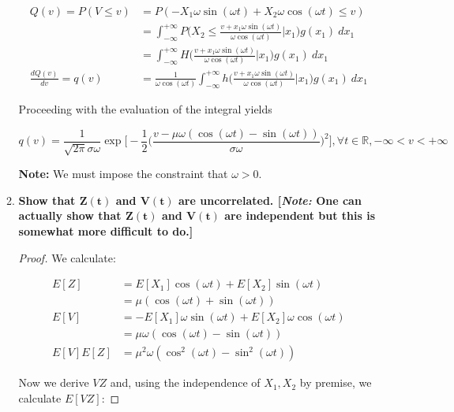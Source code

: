 \documentclass[10pt, oneside]{article}   	%
\theoremstyle{definition}
\begin{document}
\begin{enumerate}[label=9.\arabic*]
\begin{enumerate}
	\begin{align*}
	Q(v) = P(V \leq v) &= P(-X_1 \omega \sin(\omega t) + X_2 \omega \cos(\omega t) \leq v) \\
	&= \int^{+\infty}_{-\infty} P \bigg( X_2 \leq \frac{v + x_1 \omega \sin(\omega t)}{\omega \cos(\omega t)} \bigg| x_1 \bigg) g(x_1) \ dx_1 \\
	&= \int^{+\infty}_{-\infty} H \bigg( \frac{v + x_1 \omega \sin(\omega t)}{\omega \cos(\omega t)} \bigg| x_1 \bigg) g(x_1) \ dx_1 \\
	\frac{d Q(v)}{dv} = q(v) &= \frac{1}{\omega \cos(\omega t)} \int^{+\infty}_{-\infty} h \bigg( \frac{v + x_1 \omega \sin(\omega t)}{\omega \cos(\omega t)} \bigg| x_1 \bigg) g(x_1) \ dx_1
	\end{align*}
	
	Proceeding with the evaluation of the integral yields
	
	\[ \boxed{ q(v) = \frac{1}{\sqrt{2\pi} \sigma \omega} \exp \bigg[ -\frac{1}{2} \bigg( \frac{v - \mu \omega (\cos(\omega t) - \sin(\omega t))}{\sigma \omega} \bigg)^2 \bigg], \forall t \in \mathbb{R}, -\infty < v < +\infty } \]
	
	\textbf{Note:} We must impose the constraint that $\omega > 0$.
	
	\item  \begin{tcolorbox}[
	  colback=Cerulean!5!white,
	  colframe=Cerulean!75!black]
	\textbf{Show that $\bm{Z(t)}$ and $\bm{V(t)}$ are uncorrelated. [\textit{Note:} One can actually show that $\bm{Z(t)}$ and $\bm{V(t)}$ are independent but this is somewhat more difficult to do.] }
	\end{tcolorbox}
	
	\begin{proof}
	We calculate:
	
	\begin{align*}
	E[Z] &= E[X_1] \cos (\omega t) + E[X_2] \sin (\omega t) \\
	&= \mu( \cos (\omega t) + \sin (\omega t) ) \\
	E[V] &= -E[X_1] \omega \sin (\omega t) + E[X_2] \omega  \cos (\omega t) \\
	&= \mu \omega ( \cos (\omega t) - \sin (\omega t) ) \\
	E[V]E[Z] &= \mu^2 \omega (\cos^2 (\omega t) - \sin^2 (\omega t))
	\end{align*}
	
	Now we derive $VZ$ and, using the independence of $X_1, X_2$ by premise, we calculate $E[VZ]$:
	

\end{proof}
\end{enumerate}
\end{enumerate}
\end{document}
